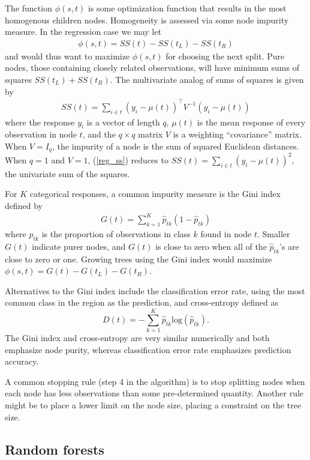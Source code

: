 The function $\phi(s, t)$ is some optimization function that results in the most homogenous children nodes. Homogeneity is assessed via some node impurity measure. In the regression case we may let
\begin{eqnarray}
\phi(s, t) = SS(t) - SS(t_L) - SS(t_R)
\label{reg_phi}
\end{eqnarray}
and would thus want to maximize $\phi(s, t)$ for choosing the next split. Pure nodes, those containing closely related observations, will have minimum sums of squares $SS(t_L) + SS(t_R)$. The multivariate analog of sums of squares is given by
\begin{eqnarray}
SS(t) = \sum_{i\in t}(y_i-\mu(t))^\top V^{-1} (y_i-\mu(t))
\label{reg_ss}
\end{eqnarray}
where the response $y_i$ is a vector of length $q$, $\mu(t)$ is the mean response of every observation in node $t$, and the $q\times q$ matrix $V$ is a weighting ``covariance'' matrix. When $V=I_q$, the impurity of a node is the sum of squared Euclidean distances. When $q=1$ and $V=1$, (\ref{reg_ss}) reduces to $SS(t) = \sum_{i\in t}(y_i-\mu(t))^2$, the univariate sum of the squares.

For $K$ categorical responses, a common impurity measure is the Gini index defined by
\begin{eqnarray}
G(t) = \sum_{k=1}^K\hat{p}_{tk}(1-\hat{p}_{tk})
\label{cla_gini}
\end{eqnarray}
where $\hat{p}_{tk}$ is the proportion of observations in class $k$ found in node $t$. Smaller $G(t)$ indicate purer nodes, and $G(t)$ is close to zero when all of the $\hat{p}_{tk}$'s are close to zero or one. Growing trees using the Gini index would maximize $\phi(s, t)=G(t) - G(t_L) - G(t_R)$. 

Alternatives to the Gini index include the classification error rate, using the most common class in the region as the prediction, and cross-entropy defined as
\[D(t) = -\sum_{k=1}^K\hat{p}_{tk}\mathrm{log}(\hat{p}_{tk}).\]
The Gini index and cross-entropy are very similar numerically and both emphasize node purity, whereas classification error rate emphasizes prediction accuracy.

A common stopping rule (step 4 in the algorithm) is to stop splitting nodes when each node has less observations than some pre-determined quantity. Another rule might be to place a lower limit on the node size, placing a constraint on the tree size.

\subsection{Random forests}

